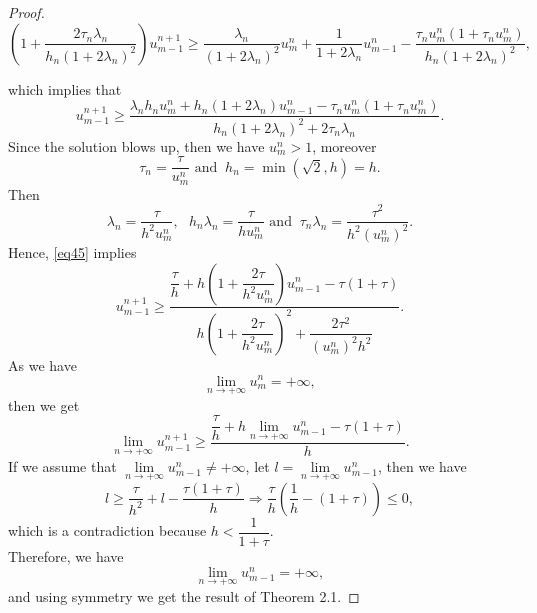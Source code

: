 \documentclass[a4paper,12pt,english,reqno]{smfart}
\begin{document}
\begin{proof}
			\begin{equation*}
			\left(1+\frac{2\tau_{n}\lambda_{n}}{h_{n}(1+2\lambda_{n})^{2}}\right)u_{m-1}^{n+1}\geq \frac{\lambda_{n}}{(1+2\lambda_{n})^{2}}u_{m}^{n}+\frac{1}{1+2\lambda_{n}}u_{m-1}^{n}
			-\frac{\tau_{n}u_{m}^{n}(1+\tau_{n}u_{m}^{n})}{h_{n}(1+2\lambda_{n})^{2}},
			\end{equation*}
	
		which implies that
		\begin{equation}
		u_{m-1}^{n+1}\geq \frac{\lambda_{n}h_{n}u_{m}^{n}+h_{n}(1+2\lambda_{n})u_{m-1}^{n}-\tau_{n}u_{m}^{n}(1+\tau_{n}u_{m}^{n})}{h_{n}(1+2\lambda_{n})^{2}+2\tau_{n}\lambda_{n}}.
		\label{eq45}
		\end{equation}
		Since the solution blows up, then we have $u_{m}^{n}>1$, moreover
		\begin{equation*}
		\tau_{n}=\frac{\tau}{u_{m}^{n}}  \text{ and } \  h_{n}=\min(\sqrt{2},h)=h.
		\end{equation*}
		Then
		\begin{equation*}
		\lambda_{n}=\frac{\tau}{h^{2}u_{m}^{n}}, \ \ \ h_{n}\lambda_{n}=\frac{\tau}{hu_{m}^{n}} \text{ and } \  \tau_{n}\lambda_{n}=\frac{\tau^{2}}{h^{2}(u_{m}^{n})^{2}}.
		\end{equation*}
		Hence, \eqref{eq45} implies
		\begin{equation*}
		u_{m-1}^{n+1}\geq \dfrac{\dfrac{\tau}{h}+h\left(1+\dfrac{2\tau}{h^{2}u_{m}^{n}}\right)u_{m-1}^{n}-\tau(1+\tau)}{h\left(1+\dfrac{2\tau}{h^{2}u_{m}^{n}}\right)^{2}+\dfrac{2\tau^{2}}{(u_{m}^{n})^{2}h^{2}}}.
		\end{equation*}
		As we have
		\begin{equation*}
		\lim_{n\rightarrow +\infty}u_{m}^{n}=+\infty,
		\end{equation*}
		then we get
		\begin{equation*}
		\lim_{n\rightarrow +\infty}u_{m-1}^{n+1}\geq \dfrac{\dfrac{\tau}{h}+h \lim\limits_{n\rightarrow +\infty}u_{m-1}^{n}-\tau(1+\tau)}{h}.
		\end{equation*}
		If we assume that $\lim\limits_{n\rightarrow +\infty}u_{m-1}^{n}\neq +\infty$, let $l=\lim\limits_{n\rightarrow +\infty}u_{m-1}^{n}$, then we have
		\begin{equation*}
		l\geq \dfrac{\tau}{h^{2}}+l-\dfrac{\tau(1+\tau)}{h}
		\Rightarrow \dfrac{\tau}{h}(\dfrac{1}{h}-(1+\tau))\leq 0,
		\end{equation*}
		which is a contradiction because $h<\dfrac{1}{1+\tau}.$\\
		Therefore, we have $$\lim_{n\rightarrow +\infty} u_{m-1}^{n}=+\infty,$$ and using symmetry we get the result of Theorem 2.1.
	\end{proof}
\end{document}
